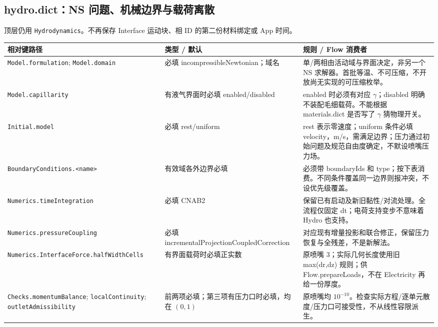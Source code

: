 \documentclass[UTF8,a4paper,11pt,fontset=fandol]{ctexart}
\numberwithin{equation}{section}
\newcommand{\code}[1]{\nolinkurl{#1}}
\begin{document}
\subsection{hydro.dict：NS 问题、机械边界与载荷离散}
顶层仍用 \code{Hydrodynamics}。不再保存 Interface 运动块、相 ID 的第二份材料绑定或 App 时间。
\begin{longtable}{@{}P{.36\textwidth}P{.23\textwidth}P{.35\textwidth}@{}}
\toprule 相对键路径 & 类型 / 默认 & 规则 / Flow 消费者\\\midrule\endhead
\code{Model.formulation}; \code{Model.domain} & 必填 incompressibleNewtonian；域名 & 单/两相由活动域与界面决定，非另一个 NS 求解器。首批等温、不可压缩，不开放尚无实现的可压缩枚举。\\
\code{Model.capillarity} & 有液气界面时必填 enabled/disabled & enabled 时必须有对应 $\gamma$；disabled 明确不装配毛细载荷。不能根据 materials.dict 是否写了 $\gamma$ 猜物理开关。\\
\code{Initial.model} & 必填 rest/uniform & rest 表示零速度；uniform 条件必填 velocity，m/s，需满足边界；压力通过初始问题及规范自由度确定，不默设喷嘴压力场。\\
\code{BoundaryConditions.<name>} & 有效域各外边界必填 & 必须带 boundaryIds 和 type；按下表消费。不同条件覆盖同一边界则报冲突，不设优先级覆盖。\\
\code{Numerics.timeIntegration} & 必填 CNAB2 & 保留已有启动及新旧黏性/对流处理。全流程仅固定 dt；电荷支持变步不意味着 Hydro 也支持。\\
\code{Numerics.pressureCoupling} & 必填 incrementalProjectionCoupledCorrection & 对应现有增量投影和联合修正，保留压力恢复与全残差，不是新解法。\\
\code{Numerics.InterfaceForce.halfWidthCells} & 有界面载荷时必填正实数 & 原喷嘴 3；实际几何长度使用旧 max(dr,dz) 规则；供 Flow.prepareLoads，不在 Electricity 再给一份厚度。\\
\code{Checks.momentumBalance}; \code{localContinuity}; \code{outletAdmissibility} & 前两项必填；第三项有压力口时必填，均在 $(0,1)$ & 原喷嘴均 $10^{-10}$。检查实际方程/逐单元散度/压力口可接受性，不从线性容限派生。\\
\bottomrule
\end{longtable}
\end{document}
